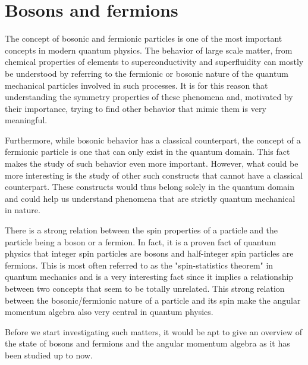 \section{Bosons and fermions}
The concept of bosonic and fermionic particles is one of the most important concepts in modern quantum physics. The behavior of large scale matter, from chemical properties of elements to superconductivity and superfluidity can mostly be understood by referring to the fermionic or bosonic nature of the quantum mechanical particles involved in such processes. It is for this reason that understanding the symmetry properties of these phenomena and, motivated by their importance, trying to find other behavior that mimic them is very meaningful.

Furthermore, while bosonic behavior has a classical counterpart, the concept of a fermionic particle is one that can only exist in the quantum domain. This fact makes the study of such behavior even more important. However, what could be more interesting is the study of other such constructs that cannot have a classical counterpart. These constructs would thus belong solely in the quantum domain and could help us understand phenomena that are strictly quantum mechanical in nature.

There is a strong relation between the spin properties of a particle and the particle being a boson or a fermion. In fact, it is a proven fact of quantum physics that integer spin particles are bosons and half-integer spin particles are fermions. This is most often referred to as the "spin-statistics theorem" in quantum mechanics and is a very interesting fact since it implies a relationship between two concepts that seem to be totally unrelated. This strong relation between the bosonic/fermionic nature of a particle and its spin make the angular momentum algebra also very central in quantum physics.

Before we start investigating such matters, it would be apt to give an overview of the state of bosons and fermions and the angular momentum algebra as it has been studied up to now.

